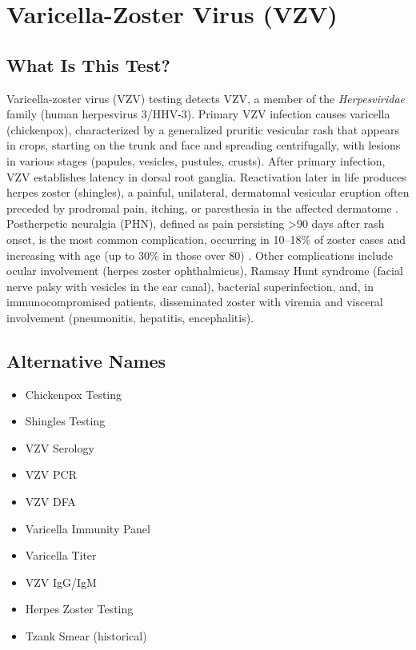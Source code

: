 \chapter{Varicella-Zoster Virus (VZV)}

\section*{What Is This Test?}
Varicella-zoster virus (VZV) testing detects VZV, a member of the \textit{Herpesviridae} family (human herpesvirus 3/HHV-3). Primary VZV infection causes varicella (chickenpox), characterized by a generalized pruritic vesicular rash that appears in crops, starting on the trunk and face and spreading centrifugally, with lesions in various stages (papules, vesicles, pustules, crusts). After primary infection, VZV establishes latency in dorsal root ganglia. Reactivation later in life produces herpes zoster (shingles), a painful, unilateral, dermatomal vesicular eruption often preceded by prodromal pain, itching, or paresthesia in the affected dermatome \cite{gnann2002herpes}. Postherpetic neuralgia (PHN), defined as pain persisting >90 days after rash onset, is the most common complication, occurring in 10--18\% of zoster cases and increasing with age (up to 30\% in those over 80) \cite{cohen2013herpes}. Other complications include ocular involvement (herpes zoster ophthalmicus), Ramsay Hunt syndrome (facial nerve palsy with vesicles in the ear canal), bacterial superinfection, and, in immunocompromised patients, disseminated zoster with viremia and visceral involvement (pneumonitis, hepatitis, encephalitis).

\section*{Alternative Names}
\begin{itemize}
  \item Chickenpox Testing
  \item Shingles Testing
  \item VZV Serology
  \item VZV PCR
  \item VZV DFA
  \item Varicella Immunity Panel
  \item Varicella Titer
  \item VZV IgG/IgM
  \item Herpes Zoster Testing
  \item Tzank Smear (historical)
\end{itemize}
